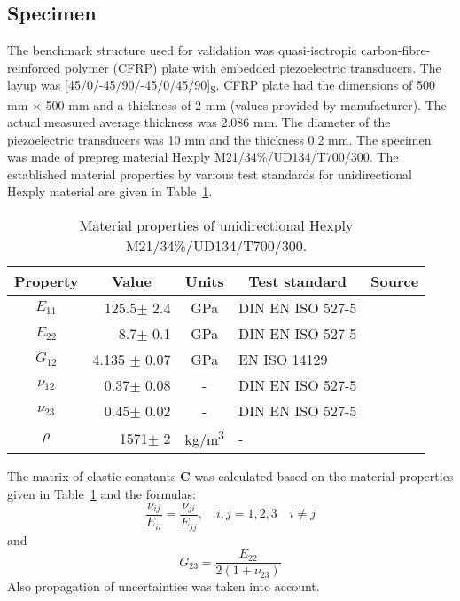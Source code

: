 \documentclass[preprint,12pt]{elsarticle}
\newcommand{\matr}[1]{\mathbf{#1}} %
\begin{document}
\subsection{Specimen}
The benchmark structure used for validation was quasi-isotropic carbon-fibre-reinforced polymer (CFRP) plate with embedded piezoelectric transducers. 
The layup was [45/0/-45/90/-45/0/45/90]\textsubscript{S}. 
CFRP plate had the dimensions of 500 mm \(\times\) 500 mm and a thickness of 2 mm 
(values provided by manufacturer). 
The actual measured average thickness was 2.086 mm. 
The diameter of the piezoelectric transducers was 10 mm and the thickness 0.2 mm. 
The specimen was made of prepreg material Hexply\textsuperscript{\textregistered} M21/34\%/UD134/T700/300. 
The established material properties by various test standards for unidirectional Hexply material are given in Table~\ref{tab:mat_prop_Moll}. 

\begin{table}
	\renewcommand{\arraystretch}{1.3}
	\centering \footnotesize
	\caption{Material properties of unidirectional Hexply M21/34\%/UD134/T700/300.}
		\begin{tabular}{crclc} 
			\toprule
			Property &  \multicolumn{1}{c}{Value}  & Units & \multicolumn{1}{c}{Test standard} & Source \\
			\midrule
			$E_{11}$ & 125.5$\pm$ 2.4   & GPa & DIN EN ISO 527-5 & \cite{Moll2019} \\
			$E_{22}$ & 8.7$\pm$ 0.1     & GPa & DIN EN ISO 527-5 & \cite{Moll2019} \\
			$G_{12}$ & 4.135 $\pm$ 0.07 & GPa & EN ISO 14129 & \cite{Petersen2016} \\
			$\nu_{12}$ & 0.37$\pm$ 0.08 & -   & DIN EN ISO 527-5 & \cite{Moll2019} \\
			$\nu_{23}$ & 0.45$\pm$ 0.02 & -   & DIN EN ISO 527-5 & \cite{Moll2019} \\
			$\rho$ & 1571$\pm$ 2 & kg/m\textsuperscript{3}   & - & \cite{Moll2019} \\
			\bottomrule 
		\end{tabular} 
		\label{tab:mat_prop_Moll}
\end{table}
The matrix of elastic constants $\matr{C}$ was calculated based on the material properties given in Table~\ref{tab:mat_prop_Moll} and the formulas:
\begin{equation}
	\frac{\nu_{ij}}{E_{ii}}=\frac{\nu_{ji}}{E_{jj}},\quad i,j=1,2,3\quad i\ne j
	\label{eq:recalc}
\end{equation}
and 
\begin{equation}
	G_{23} = \frac{E_{22}}{2(1+\nu_{23})}
	\label{eq:recalc2}
\end{equation}
Also propagation of uncertainties was taken into account.
\end{document}
